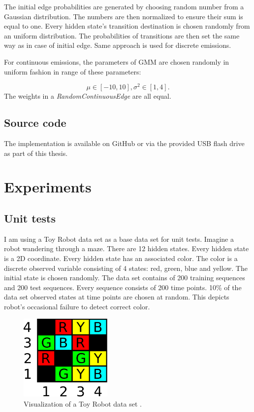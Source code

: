 \documentclass[thesis=B,english]{FITthesis}[2012/06/26]
\begin{document}
The initial edge probabilities are generated by choosing random number from a Gaussian distribution. The numbers are then normalized to ensure their sum is equal to one. Every hidden state's transition destination is chosen randomly from an uniform distribution. The probabilities of transitions are then set the same way as in case of initial edge. Same approach is used for discrete emissions.

For continuous emissions, the parameters of GMM are chosen randomly in uniform fashion in range of these parameters:

\begin{equation*}
\mu \in [-10,10],
\sigma^2 \in [1,4].
\end{equation*}
The weights in a \textit{RandomContinuousEdge} are all equal.

\section{Source code}
The implementation is available on GitHub \cite{dnbc-scala} or via the provided USB flash drive as part of this thesis.

\chapter{Experiments}

\section{Unit tests}

I am using a Toy Robot data set \cite{robot-maze} as a base data set for unit tests. Imagine a robot wandering through a maze. There are 12 hidden states. Every hidden state is a 2D coordinate. Every hidden state has an associated color. The color is a discrete observed variable consisting of 4 states: red, green, blue and yellow. The initial state is chosen randomly. The data set contains of 200 training sequences and 200 test sequences. Every sequence consists of 200 time points. 10\% of the data set observed states at time points are chosen at random. This depicts robot's occasional failure to detect correct color.

\begin{figure}
	\centering
 	\includegraphics[width=0.4\textwidth]{robot_maze}
 	\caption{Visualization of a Toy Robot data set \cite{robot-maze}.}
 	\label{fig:robot_maze}
\end{figure}
\end{document}
